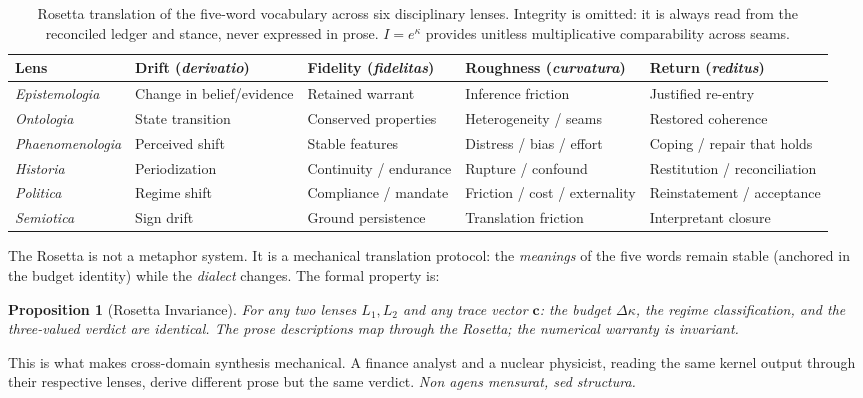 \documentclass[
  aps,
  prd,
  twocolumn,
  superscriptaddress,
  nofootinbib,
  floatfix
]{revtex4-2}
\newtheorem{proposition}[theorem]{Proposition}
\newcommand{\tvec}{\mathbf{c}}
\newcommand{\Logint}{\kappa}
\newcommand{\lat}[1]{\textit{#1}}
\begin{document}
\begin{table}[t]
\centering
\small
\caption{Rosetta translation of the five-word vocabulary across
  six disciplinary lenses. Integrity is omitted: it is always
  read from the reconciled ledger and stance, never expressed in
  prose. $I = e^\Logint$ provides unitless multiplicative
  comparability across seams.}
\label{tab:rosetta}
\begin{tabular}{@{}lllll@{}}
\toprule
\textbf{Lens} & \textbf{Drift} (\lat{derivatio}) &
  \textbf{Fidelity} (\lat{fidelitas}) &
  \textbf{Roughness} (\lat{curvatura}) &
  \textbf{Return} (\lat{reditus}) \\
\midrule
\lat{Epistemologia} &
  Change in belief/evidence & Retained warrant &
  Inference friction & Justified re-entry \\
\lat{Ontologia} &
  State transition & Conserved properties &
  Heterogeneity / seams & Restored coherence \\
\lat{Phaenomenologia} &
  Perceived shift & Stable features &
  Distress / bias / effort & Coping / repair that holds \\
\lat{Historia} &
  Periodization & Continuity / endurance &
  Rupture / confound & Restitution / reconciliation \\
\lat{Politica} &
  Regime shift & Compliance / mandate &
  Friction / cost / externality & Reinstatement / acceptance \\
\lat{Semiotica} &
  Sign drift & Ground persistence &
  Translation friction & Interpretant closure \\
\bottomrule
\end{tabular}
\end{table}

\noindent
The Rosetta is not a metaphor system. It is a mechanical
translation protocol: the \emph{meanings} of the five words
remain stable (anchored in the budget identity) while the
\emph{dialect} changes. The formal property is:

\begin{proposition}[Rosetta Invariance]\label{prop:rosetta}
For any two lenses $L_1, L_2$ and any trace vector $\tvec$:
the budget $\Delta\Logint$, the regime classification, and the
three-valued verdict are identical. The prose descriptions map
through the Rosetta; the numerical warranty is invariant.
\end{proposition}

\noindent
This is what makes cross-domain synthesis mechanical. A finance
analyst and a nuclear physicist, reading the same kernel output
through their respective lenses, derive different prose but
the same verdict. \lat{Non agens mensurat, sed structura.}
\end{document}
